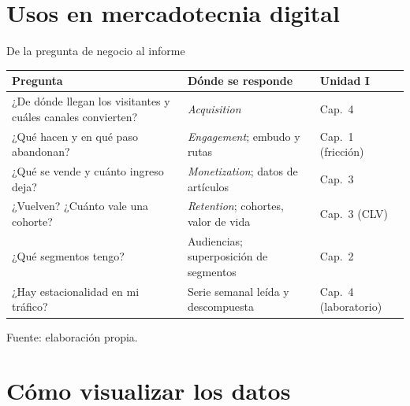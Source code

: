 \documentclass[aspectratio=169,xcolor=dvipsnames]{beamer}
\newcommand{\fuente}[1]{{\tiny\color{IPNgris}Fuente: #1}}
\begin{document}
\section[Usos]{Usos en mercadotecnia digital}

\begin{frame}{De la pregunta de negocio al informe}
\scriptsize
\begin{center}
\begin{tabular}{@{}>{\raggedright}p{4.4cm}>{\raggedright}p{4.7cm}>{\raggedright\arraybackslash}p{2.6cm}@{}}
\toprule
\textbf{Pregunta} & \textbf{Dónde se responde} & \textbf{Unidad I} \\
\midrule
¿De dónde llegan los visitantes y cuáles canales convierten? & \textit{Acquisition} & Cap.~4 \\
¿Qué hacen y en qué paso abandonan? & \textit{Engagement}; embudo y rutas & Cap.~1 (fricción) \\
¿Qué se vende y cuánto ingreso deja? & \textit{Monetization}; datos de artículos & Cap.~3 \\
¿Vuelven? ¿Cuánto vale una cohorte? & \textit{Retention}; cohortes, valor de vida & Cap.~3 (CLV) \\
¿Qué segmentos tengo? & Audiencias; superposición de segmentos & Cap.~2 \\
¿Hay estacionalidad en mi tráfico? & Serie semanal leída y descompuesta & Cap.~4 (laboratorio) \\
\bottomrule
\end{tabular}
\end{center}
\fuente{elaboración propia.}
\end{frame}

\section[Visualizar]{Cómo visualizar los datos}
\end{document}
